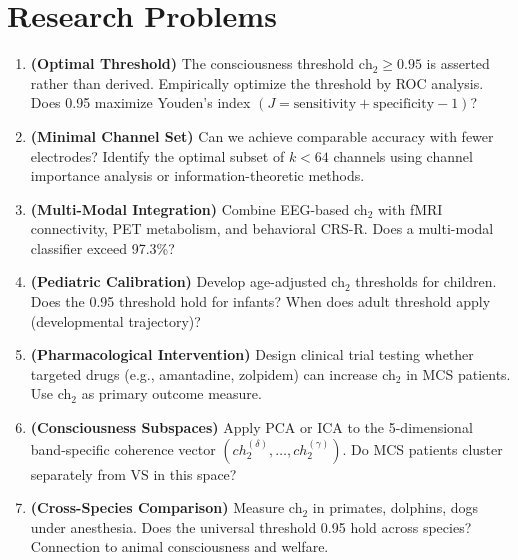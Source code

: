\section*{Research Problems}

\begin{enumerate}
\item \textbf{(Optimal Threshold)} The consciousness threshold
$\text{ch}_2 \geq 0.95$ is asserted rather than derived.%
 Empirically optimize the threshold by ROC analysis. Does 0.95 maximize Youden's index $(J = \text{sensitivity} + \text{specificity} - 1)$?

\item \textbf{(Minimal Channel Set)} Can we achieve comparable accuracy with fewer electrodes? Identify the optimal subset of $k < 64$ channels using channel importance analysis or information-theoretic methods.

\item \textbf{(Multi-Modal Integration)} Combine EEG-based ch$_2$ with fMRI connectivity, PET metabolism, and behavioral CRS-R. Does a multi-modal classifier exceed 97.3\%?

\item \textbf{(Pediatric Calibration)} Develop age-adjusted ch$_2$ thresholds for children. Does the 0.95 threshold hold for infants? When does adult threshold apply (developmental trajectory)?

\item \textbf{(Pharmacological Intervention)} Design clinical trial testing whether targeted drugs (e.g., amantadine, zolpidem) can increase ch$_2$ in MCS patients. Use ch$_2$ as primary outcome measure.

\item \textbf{(Consciousness Subspaces)} Apply PCA or ICA to the 5-dimensional band-specific coherence vector $(ch_2^{(\delta)}, \ldots, ch_2^{(\gamma)})$. Do MCS patients cluster separately from VS in this space?

\item \textbf{(Cross-Species Comparison)} Measure ch$_2$ in primates, dolphins, dogs under anesthesia. Does the universal threshold 0.95 hold across species? Connection to animal consciousness and welfare.
\end{enumerate}
